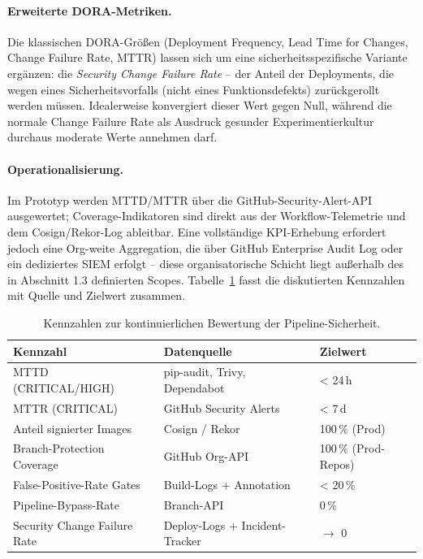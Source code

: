 \documentclass[12pt, a4paper]{scrartcl}
\begin{document}
\paragraph{Erweiterte DORA-Metriken.}
Die klassischen DORA-Größen (Deployment Frequency, Lead Time for
Changes, Change Failure Rate, MTTR) lassen sich um eine
sicherheits\-spezifische Variante ergänzen: die \emph{Security Change
Failure Rate} -- der Anteil der Deployments, die wegen eines
Sicherheits\-vorfalls (nicht eines Funktions\-defekts) zurückgerollt
werden müssen. Idealerweise konvergiert dieser Wert gegen Null,
während die normale Change Failure Rate als Ausdruck gesunder
Experimentier\-kultur durchaus moderate Werte annehmen darf.

\paragraph{Operationalisierung.}
Im Prototyp werden MTTD/MTTR über die GitHub-Security-Alert-API
ausgewertet; Coverage-Indikatoren sind direkt aus der
Workflow-Telemetrie und dem Cosign/Rekor-Log ableitbar. Eine
vollständige KPI-Erhebung erfordert jedoch eine
Org-weite Aggregation, die über GitHub Enterprise Audit Log oder
ein dediziertes SIEM erfolgt -- diese organisatorische Schicht liegt
außerhalb des in Abschnitt 1.3 definierten Scopes. Tabelle~\ref{tab:kpis}
fasst die diskutierten Kennzahlen mit Quelle und Zielwert zusammen.

\begin{table}[h]
\centering
\small
\begin{tabular}{p{4.6cm} p{4.4cm} p{4.4cm}}
\toprule
\textbf{Kennzahl} & \textbf{Datenquelle} & \textbf{Zielwert} \\
\midrule
MTTD (CRITICAL/HIGH) & pip-audit, Trivy, Dependabot & < 24\,h \\
MTTR (CRITICAL) & GitHub Security Alerts & < 7\,d \\
Anteil signierter Images & Cosign / Rekor & 100\,\% (Prod) \\
Branch-Protection Coverage & GitHub Org-API & 100\,\% (Prod-Repos) \\
False-Positive-Rate Gates & Build-Logs + Annotation & < 20\,\% \\
Pipeline-Bypass-Rate & Branch-API & 0\,\% \\
Security Change Failure Rate & Deploy-Logs + Incident-Tracker & $\to$ 0 \\
\bottomrule
\end{tabular}
\caption{Kennzahlen zur kontinuierlichen Bewertung der
Pipeline-Sicherheit.}
\label{tab:kpis}
\end{table}
\end{document}
